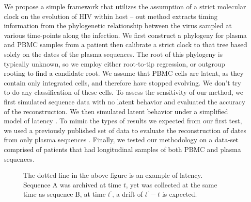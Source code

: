 We propose a simple framework that utilizes the assumption of a strict molecular clock on the evolution of HIV within host -- out method extracts timing information from the phylogenetic relationship between the virus sampled at various time-points along the infection. We first construct a phylogeny for plasma and PBMC samples from a patient then calibrate a strict clock to that tree based  solely on the dates of the plasma sequences. The root of this phylogeny is typically unknown, so we employ either root-to-tip regression, or outgroup rooting to find a candidate root. We assume that PBMC cells are latent, as they contain only integrated cells, and therefore have stopped evolving. We don't try to do any classification of these cells. To assess the sensitivity of our method, we first simulated sequence data with no latent behavior and evaluated the accuracy of the reconstruction. We then simulated latent behavior under a simplified model of latency \citep{Immonen14}. To mimic the types of results we expected from our first test, we used a previously published set of data to evaluate the reconstruction of dates from only plasma sequences \citep{McCloskey14}. Finally, we tested our methodology on a data-set comprised of patients that had longitudinal samples of both PBMC and plasma sequences.  

\begin{figure} \label{fig:latenttree}
	\centering
	\scalebox{5}{}
	\caption[Example of latent behavior]{The dotted line in the above figure is an example of latency. Sequence A was archived at time $t$, yet was collected at the same time as sequence B, at time $t^\prime$, a drift of $t^\prime - t$ is expected.}
\end{figure}
